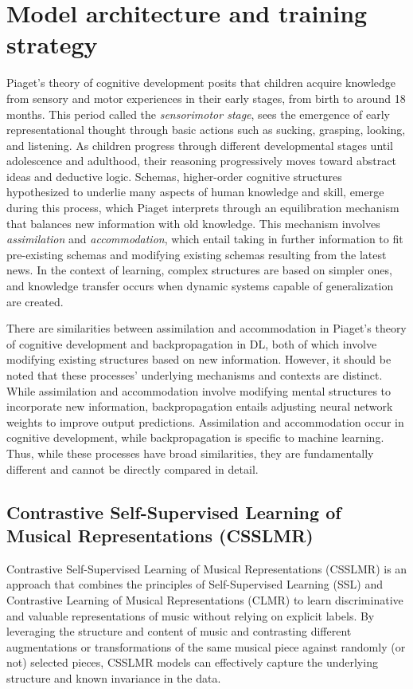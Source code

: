 \section{Model architecture and training strategy}
Piaget's theory of cognitive development \cite{Huitt2003PiagetsDevelopment} posits that children acquire knowledge from sensory and motor experiences in their early stages, from birth to around 18 months. This period called the \textit{sensorimotor stage}, sees the emergence of early representational thought through basic actions such as sucking, grasping, looking, and listening. As children progress through different developmental stages until adolescence and adulthood, their reasoning progressively moves toward abstract ideas and deductive logic. Schemas, higher-order cognitive structures hypothesized to underlie many aspects of human knowledge and skill, emerge during this process, which Piaget interprets through an equilibration mechanism that balances new information with old knowledge. This mechanism involves \textit{assimilation} and \textit{accommodation}, which entail taking in further information to fit pre-existing schemas and modifying existing schemas resulting from the latest news. In the context of learning, complex structures are based on simpler ones, and knowledge transfer occurs when dynamic systems capable of generalization are created. \cite{audioselfsupsurvey}

There are similarities between assimilation and accommodation in Piaget's theory of cognitive development and backpropagation in DL, both of which involve modifying existing structures based on new information. However, it should be noted that these processes' underlying mechanisms and contexts are distinct. While assimilation and accommodation involve modifying mental structures to incorporate new information, backpropagation entails adjusting neural network weights to improve output predictions. Assimilation and accommodation occur in cognitive development, while backpropagation is specific to machine learning. Thus, while these processes have broad similarities, they are fundamentally different and cannot be directly compared in detail.

\subsection{Contrastive Self-Supervised Learning of Musical Representations (CSSLMR)}

Contrastive Self-Supervised Learning of Musical Representations (CSSLMR) is an approach that combines the principles of Self-Supervised Learning (SSL) \cite{audioselfsupsurvey} and Contrastive Learning of Musical Representations (CLMR) \cite{CLMR2021} to learn discriminative and valuable representations of music without relying on explicit labels. By leveraging the structure and content of music and contrasting different augmentations or transformations of the same musical piece against randomly (or not) selected pieces, CSSLMR models can effectively capture the underlying structure and known invariance in the data.

